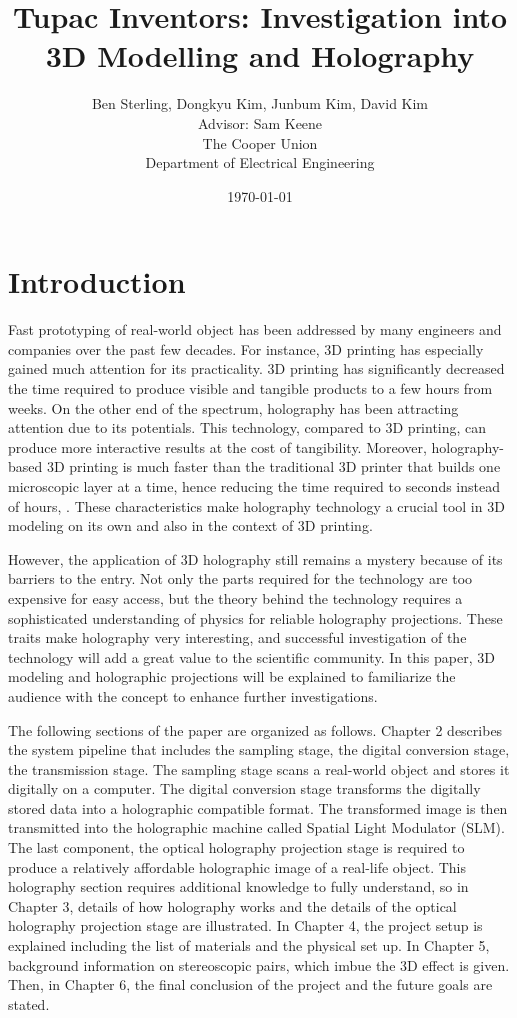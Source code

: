 \documentclass[12pt]{article}
\title{\textbf{Tupac Inventors: Investigation into 3D Modelling and Holography}}
\date{\today}
\author{Ben Sterling, Dongkyu Kim, Junbum Kim, David Kim \\ Advisor: Sam Keene \\ The Cooper Union \\ Department of Electrical Engineering}
\begin{document}
\maketitle
\clearpage

\section{Introduction}
\qquad
Fast prototyping of real-world object has been addressed by many engineers and companies over the past few decades. For instance, 3D printing has especially gained much attention for its practicality. 3D printing has significantly decreased the time required to produce visible and tangible products to a few hours from weeks. On the other end of the spectrum, holography has been attracting attention due to its potentials. This technology, compared to 3D printing, can produce more interactive results at the cost of tangibility. Moreover, holography-based 3D printing is much faster than the traditional 3D printer that builds one microscopic layer at a time, hence reducing the time required to seconds instead of hours,  \cite{Shusteffeaao5496}. These characteristics make holography technology a crucial tool in 3D modeling on its own and also in the context of 3D printing.

However, the application of 3D holography still remains a mystery because of its barriers to the entry. Not only the parts required for the technology are too expensive for easy access, but the theory behind the technology requires a sophisticated understanding of physics for reliable holography projections. These traits make holography very interesting, and successful investigation of the technology will add a great value to the scientific community. In this paper, 3D modeling and holographic projections will be explained to familiarize the audience with the concept to enhance further investigations.

\par
The following sections of the paper are organized as follows. Chapter 2 describes the system pipeline that includes the sampling stage, the digital conversion stage, the transmission stage. The sampling stage scans a real-world object and stores it digitally on a computer. The digital conversion stage transforms the digitally stored data into a holographic compatible format. The transformed image is then transmitted into the holographic machine called Spatial Light Modulator (SLM). The last component, the optical holography projection stage is required to produce a relatively affordable holographic image of a real-life object. This holography section requires additional knowledge to fully understand, so in Chapter 3, details of how holography works and the details of the optical holography projection stage are illustrated. In Chapter 4, the project setup is explained including the list of materials and the physical set up. In Chapter 5, background information on stereoscopic pairs, which imbue the 3D effect is given. Then, in Chapter 6, the final conclusion of the project and the future goals are stated.
\end{document}
